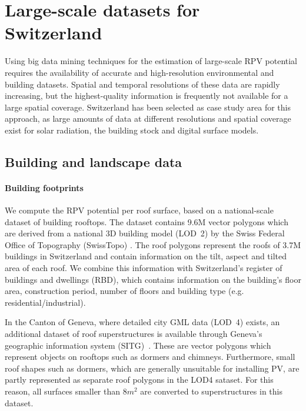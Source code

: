 \chapter{Large-scale datasets for Switzerland}
\label{data}

Using big data mining techniques for the estimation of large-scale RPV potential requires the availability of accurate and high-resolution environmental and building datasets. Spatial and temporal resolutions of these data are rapidly increasing, but the highest-quality information is frequently not available for a large spatial coverage. Switzerland has been selected as case study area for this approach, as large amounts of data at different resolutions and spatial coverage exist for solar radiation, the building stock and digital surface models.

\section{Building and landscape data}

\subsubsection{Building footprints}
We compute the RPV potential per roof surface, based on a national-scale dataset of building rooftops.
The dataset contains 9.6M vector polygons which are derived from a national 3D building model (LOD~2) by the Swiss Federal Office of Topography (SwissTopo) \cite{klauser_solarpotentialanalyse_2016}.
The roof polygons represent the roofs of 3.7M buildings in Switzerland and contain information  on the tilt, aspect and tilted area of each roof.
We combine this information with Switzerland's register of buildings and dwellings (RBD), which contains information on the building's floor area, construction period, number of floors and building type (e.g. residential/industrial). 

In the Canton of Geneva, where detailed city GML data (LOD~4) exists, an additional dataset of roof superstructures is available through Geneva's geographic information system (SITG)~\cite{sitg_superstructures_2019}. %
These are vector polygons which represent objects on rooftops such as dormers and chimneys. 
Furthermore, small roof shapes such as dormers, which are generally unsuitable for installing PV, are partly represented as separate roof polygons in the LOD4 sataset.
For this reason, all surfaces smaller than $8m^2$ are converted to superstructures in this dataset. 

